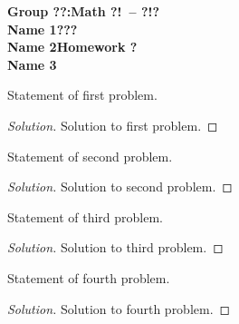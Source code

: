 \documentclass{article}
\newcommand{\hw}{?}            %
\newcommand{\group}{??}        %
\newcommand{\nameA}{Name 1}    %
\newcommand{\nameB}{Name 2}    %
\newcommand{\nameC}{Name 3}    %
\newcommand{\term}{???}        %
\newcommand{\coursenumber}{?!} %
\newcommand{\coursename}{?!?}  %
\newenvironment{problem}[2][Problem]
{\begin{trivlist}\item[\hskip \labelsep {\bfseries #1}\hskip \labelsep {\bfseries \hw.#2.}]}
{\end{trivlist}}
\begin{document}
\thispagestyle{empty}
\pagestyle{empty}

\textbf{Group \group:}\hfill\textbf{Math \coursenumber ~-- \coursename}\\
\textbf{\nameA}\hfill\textbf{\term}\\
\textbf{\nameB}\hfill\textbf{Homework \hw}\\
\textbf{\nameC}\\


\begin{problem}{1}
Statement of first problem.
\end{problem}
\begin{proof}[Solution]
Solution to first problem.
\end{proof}

\medskip 

\begin{problem}{2}
Statement of second problem.
\end{problem}
\begin{proof}[Solution]
Solution to second problem.
\end{proof}

\medskip 

\begin{problem}{3}
Statement of third problem.
\end{problem}
\begin{proof}[Solution]
Solution to third problem.
\end{proof}

\medskip 

\begin{problem}{4}
Statement of fourth problem.
\end{problem}
\begin{proof}[Solution]
Solution to fourth problem.
\end{proof}
\end{document}

